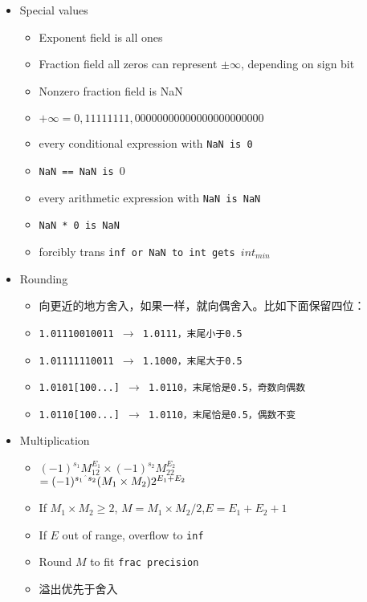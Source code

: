 \begin{itemize}[nosep]
\begin{itemize}[nosep]
\begin{tabular}{|c|c|c|}
            \end{tabular} 
    \end{itemize}
    \item Special values
    \begin{itemize}[nosep]
        \item Exponent field is all ones
        \item Fraction field all zeros can represent $\pm \infty$, depending on sign bit
        \item Nonzero fraction field is NaN
        \item $+\infty=0,11111111,00000000000000000000000$
        \item every conditional expression with \tt{NaN} is 0
        \item \tt{NaN == NaN} is $0$
        \item every arithmetic expression with \tt{NaN} is \tt{NaN}
        \item \tt{NaN * 0} is \tt{NaN}
        \item forcibly trans \tt{inf} or \tt{NaN} to \tt{int} gets $int_{min}$
    \end{itemize}
    \item Rounding
    \begin{itemize}[nosep]
        \item 向更近的地方舍入，如果一样，就向偶舍入。比如下面保留四位：
        \item \tt{1.01110010011} $\to$ \tt{1.0111}，末尾小于0.5
        \item \tt{1.01111110011} $\to$ \tt{1.1000}，末尾大于0.5
        \item \tt{1.0101[100...]} $\to$ \tt{1.0110}，末尾恰是0.5，奇数向偶数
        \item \tt{1.0110[100...]} $\to$ \tt{1.0110}，末尾恰是0.5，偶数不变
    \end{itemize}
    \item Multiplication
    \begin{itemize}[nosep]
        \item $(-1)^{s_1}M_12^{E_1} \times (-1)^{s_2}M_22^{E_2}$ \\
              \null \qquad \qquad \qquad \qquad $= (-1)^{s_1 \string^ s_2}(M_1 \times M_2)2^{E_1 + E_2}$
        \item If $M_1 \times M_2 \geq 2$, $M= M_1\times M_2/2$,$E=E_1+E_2+1$
        \item If $E$ out of range, overflow to \tt{inf}
        \item Round $M$ to fit \tt{frac} precision
        \item 溢出优先于舍入
    \end{itemize}
\end{itemize}